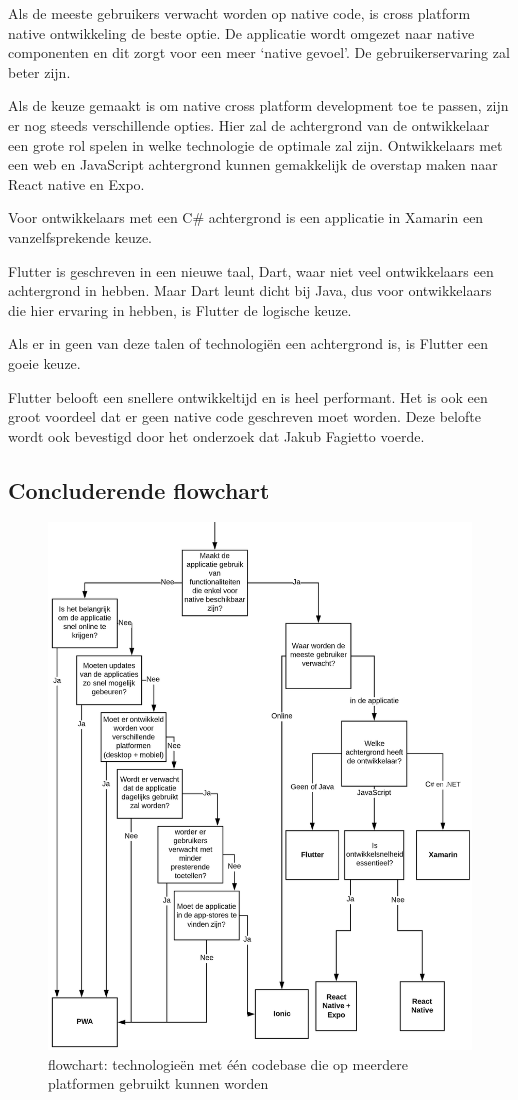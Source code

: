 Als de meeste gebruikers verwacht worden op native code, is cross platform native ontwikkeling de beste optie. De applicatie wordt omgezet naar native componenten en dit zorgt voor een meer ‘native gevoel’. De gebruikerservaring zal beter zijn.

Als de keuze gemaakt is om native cross platform development toe te passen, zijn er nog steeds verschillende opties. Hier zal de achtergrond van de ontwikkelaar een grote rol spelen in welke technologie de optimale zal zijn. Ontwikkelaars met een web en JavaScript achtergrond kunnen gemakkelijk de overstap maken naar React native en Expo. 

Voor ontwikkelaars met een C\# achtergrond is een applicatie in Xamarin een vanzelfsprekende keuze. 

Flutter is geschreven in een nieuwe taal, Dart,  waar niet veel ontwikkelaars een achtergrond in hebben. Maar Dart leunt dicht bij Java, dus voor ontwikkelaars die hier ervaring in hebben, is Flutter de logische keuze.

Als er in geen van deze talen of technologiën een achtergrond is, is Flutter een goeie keuze.
\autocite{Leler2017}
\autocite{Wenhao2018}

Flutter belooft een snellere ontwikkeltijd en is heel performant. Het is ook een groot voordeel dat er geen native code geschreven moet worden.
Deze belofte wordt ook bevestigd door het onderzoek dat Jakub Fagietto voerde.
\autocite{Fagietto2019}


\subsection{Concluderende flowchart}
\begin{figure}[]
	\centering
	\includegraphics{./img/flowchart.png}
	\caption{flowchart: technologieën met één codebase die op meerdere platformen gebruikt kunnen worden}
\end{figure}

\clearpage


